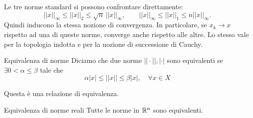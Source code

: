 \documentclass[a4paper]{article}
\begin{document}
Le tre norme standard si possono confrontare direttamente:
\[
    ||x||_\infty\leq||x||_2\leq\sqrt{n}\,||x||_\infty,
    \qquad
    ||x||_\infty\leq||x||_1\leq n||x||_\infty.
\]
Quindi inducono la stessa nozione di convergenza. In particolare, se \(x_k\to x\)
rispetto ad una di queste norme, converge anche rispetto alle altre. Lo stesso vale per la topologia
indotta e per la nozione di successione di Cauchy.

\begin{snippetdefinition}{Equivalenza di norme}
    Diciamo che due norme \(||\cdot||, |\cdot|\) sono equivalenti
    se \(\exists 0 < \alpha \leq \beta\) tale che
    \[
        \alpha|x| \leq ||x|| \leq \beta|x|, \quad \forall x \in X
    \]
\end{snippetdefinition}

Questa è una relazione di equivalenza.

\pagebreak

\begin{snippettheorem}{Equivalenza di norme reali}
    Tutte le norme in \(\mathbb{R}^n\) sono equivalenti.
\end{snippettheorem}
\end{document}

